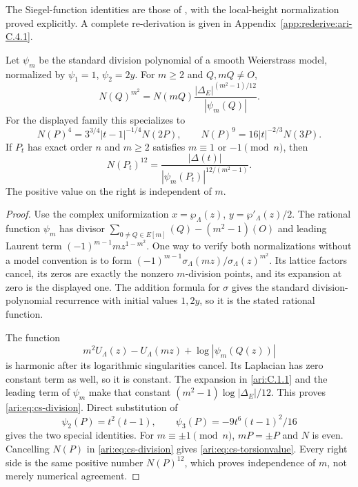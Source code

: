 

The Siegel-function identities are those of \citet[Remark~2.2 and Proposition~2.3]{Shin2015}, with the local-height normalization proved explicitly. A complete re-derivation is given in Appendix~\ref{app:rederive:ari-C.4.1}.


\begin{proposition}\label{ari:C.4.2}
Let $\psi_m$ be the standard division polynomial of a smooth
Weierstrass model, normalized by $\psi_1=1$, $\psi_2=2y$.
For $m\ge2$ and $Q,mQ\ne O$,
\begin{equation}\label{ari:eq:cs-division}
 N(Q)^{m^2}
       =N(mQ)\frac{|\Delta_E|^{(m^2-1)/12}}{|\psi_m(Q)|}.
\end{equation}
For the displayed family this specializes to
\[
 N(P)^4=3^{3/4}|t-1|^{-1/4}N(2P),\qquad
 N(P)^9=16|t|^{-2/3}N(3P).
\]
If $P_t$ has exact order $n$ and $m\ge2$ satisfies
$m\equiv1$ or $-1\pmod n$, then
\begin{equation}\label{ari:eq:cs-torsionvalue}
 N(P_t)^{12}
       =\frac{|\Delta(t)|}{|\psi_m(P_t)|^{12/(m^2-1)}}.
\end{equation}
The positive value on the right is independent of $m$.
\end{proposition}

\begin{proof}
Use the complex uniformization $x=\wp_\Lambda(z)$,
$y=\wp'_\Lambda(z)/2$. The rational function $\psi_m$ has divisor
$\sum_{0\ne Q\in E[m]}(Q)-(m^2-1)(O)$ and leading Laurent term
$(-1)^{m-1}m z^{1-m^2}$. One way to verify both normalizations without
a model convention is to form
$(-1)^{m-1}\sigma_\Lambda(mz)/\sigma_\Lambda(z)^{m^2}$.
Its lattice factors cancel, its zeros are exactly the nonzero
$m$-division points, and its expansion at zero is the displayed
one. The addition formula for $\sigma$ gives the standard
division-polynomial recurrence with initial values $1,2y$, so it is
the stated rational function.

The function
\[
 m^2U_\Lambda(z)-U_\Lambda(mz)
                    +\log|\psi_m(Q(z))|
\]
is harmonic after its logarithmic singularities cancel. Its
Laplacian has zero constant term as well, so it is constant.
The expansion in \ref{ari:C.1.1} and the leading term of $\psi_m$ make that
constant $(m^2-1)\log|\Delta_E|/12$. This proves
\eqref{ari:eq:cs-division}. Direct substitution of
\[
 \psi_2(P)=t^2(t-1),\qquad
 \psi_3(P)=-9t^6(t-1)^2/16
\]
gives the two special identities. For $m\equiv\pm1\pmod n$,
$mP=\pm P$ and $N$ is even. Cancelling $N(P)$ in
\eqref{ari:eq:cs-division} gives \eqref{ari:eq:cs-torsionvalue}.
Every right side is the same positive number $N(P)^{12}$, which
proves independence of $m$, not merely numerical agreement.
\end{proof}

